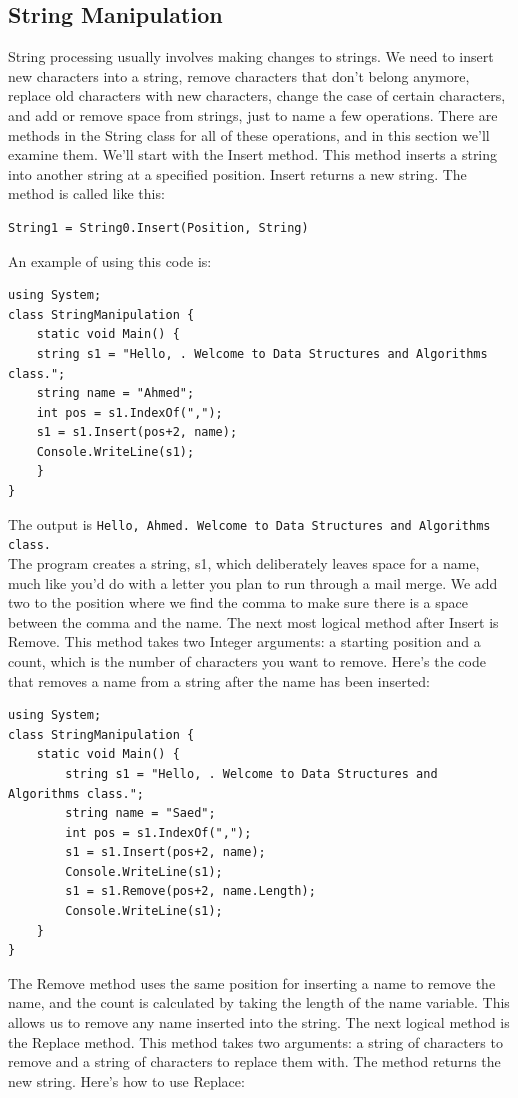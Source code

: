 \documentclass[12pt,a4paper,final,twoside,titlepage]{book}
\begin{document}
\subsection{String Manipulation}
String processing usually involves making changes to strings. We need to insert new characters into a string, remove characters that don’t belong anymore, replace old characters with new characters, change the case of certain characters, and add or remove space from strings, just to name a few operations. There are methods in the String class for all of these operations, and in this section we’ll examine them. We’ll start with the Insert method. This method inserts a string into another string at a specified position. Insert returns a new string. The method is called like this:
\begin{lstlisting}
String1 = String0.Insert(Position, String)
\end{lstlisting}
An example of using this code is:
\begin{lstlisting}
using System; 
class StringManipulation {
	static void Main() {
	string s1 = "Hello, . Welcome to Data Structures and Algorithms class."; 
	string name = "Ahmed";
	int pos = s1.IndexOf(",");
	s1 = s1.Insert(pos+2, name); 
	Console.WriteLine(s1);
	} 
}
\end{lstlisting}
The output is
\texttt{Hello, Ahmed. Welcome to Data Structures and Algorithms class.}\\
The program creates a string, s1, which deliberately leaves space for a name, much like you’d do with a letter you plan to run through a mail merge. We add two to the position where we find the comma to make sure there is a space between the comma and the name. The next most logical method after Insert is Remove. This method takes two Integer arguments: a starting position and a count, which is the number of characters you want to remove. Here’s the code that removes a name from a string after the name has been inserted:
\begin{lstlisting}
using System; 
class StringManipulation {
	static void Main() {
		string s1 = "Hello, . Welcome to Data Structures and Algorithms class."; 
		string name = "Saed";
		int pos = s1.IndexOf(",");
		s1 = s1.Insert(pos+2, name); 
		Console.WriteLine(s1);
		s1 = s1.Remove(pos+2, name.Length); 
		Console.WriteLine(s1);
	}
}
\end{lstlisting}
The Remove method uses the same position for inserting a name to remove the name, and the count is calculated by taking the length of the name variable. This allows us to remove any name inserted into the string. The next logical method is the Replace method. This method takes two arguments: a string of characters to remove and a string of characters to replace them with. The method returns the new string. Here’s how to use Replace:
\end{document}
